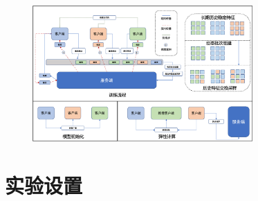 \begin{figure}
    \centering
    \includegraphics[width=0.75\textwidth]{figures/medfed_framework.png}
    \label{fig:diagram}
\end{figure}

\section{实验设置}





